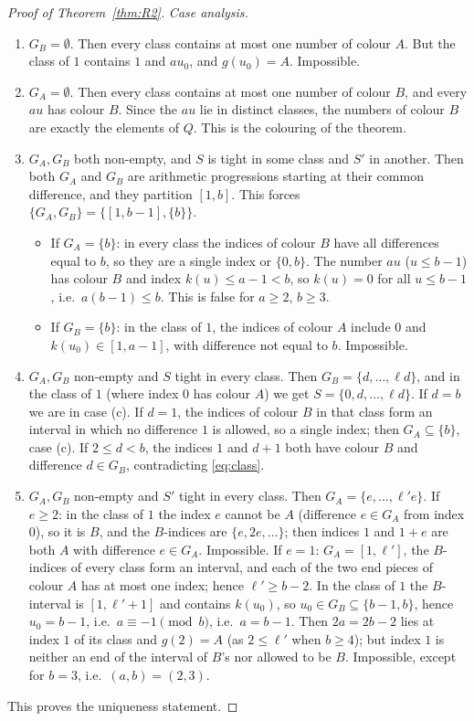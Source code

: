 \documentclass[11pt,a4paper]{article}
\theoremstyle{definition}
\theoremstyle{remark}
\begin{document}
\begin{proof}[Proof of Theorem~\ref{thm:R2}]
\emph{Case analysis.}
\begin{enumerate}[label=(\alph*)]
\item $G_B=\emptyset$. Then every class contains at most one number of colour $A$. But the class of $1$ contains $1$ and $au_0$, and $g(u_0)=A$. Impossible.
\item $G_A=\emptyset$. Then every class contains at most one number of colour $B$, and every $au$ has colour $B$. Since the $au$ lie in distinct classes, the numbers of colour $B$ are exactly the elements of $Q$. This is the colouring of the theorem.
\item $G_A,G_B$ both non-empty, and $S$ is tight in some class and $S'$ in another. Then both $G_A$ and $G_B$ are arithmetic progressions starting at their common difference, and they partition $[1,b]$. This forces $\{G_A,G_B\}=\{[1,b-1],\{b\}\}$.
  \begin{itemize}
  \item If $G_A=\{b\}$: in every class the indices of colour $B$ have all differences equal to $b$, so they are a single index or $\{0,b\}$. The number $au$ ($u\le b-1$) has colour $B$ and index $k(u)\le a-1<b$, so $k(u)=0$ for all $u\le b-1$, i.e.\ $a(b-1)\le b$. This is false for $a\ge2$, $b\ge3$.
  \item If $G_B=\{b\}$: in the class of $1$, the indices of colour $A$ include $0$ and $k(u_0)\in[1,a-1]$, with difference not equal to $b$. Impossible.
  \end{itemize}
\item $G_A,G_B$ non-empty and $S$ tight in every class. Then $G_B=\{d,\dots,\ell d\}$, and in the class of $1$ (where index $0$ has colour $A$) we get $S=\{0,d,\dots,\ell d\}$.
  If $d=b$ we are in case (c). If $d=1$, the indices of colour $B$ in that class form an interval in which no difference $1$ is allowed, so a single index; then $G_A\subseteq\{b\}$, case (c). If $2\le d<b$, the indices $1$ and $d+1$ both have colour $B$ and difference $d\in G_B$, contradicting \eqref{eq:class}.
\item $G_A,G_B$ non-empty and $S'$ tight in every class. Then $G_A=\{e,\dots,\ell'e\}$.
  If $e\ge2$: in the class of $1$ the index $e$ cannot be $A$ (difference $e\in G_A$ from index $0$), so it is $B$, and the $B$-indices are $\{e,2e,\dots\}$; then indices $1$ and $1+e$ are both $A$ with difference $e\in G_A$. Impossible.
  If $e=1$: $G_A=[1,\ell']$, the $B$-indices of every class form an interval, and each of the two end pieces of colour $A$ has at most one index; hence $\ell'\ge b-2$. In the class of $1$ the $B$-interval is $[1,\ell'+1]$ and contains $k(u_0)$, so $u_0\in G_B\subseteq\{b-1,b\}$, hence $u_0=b-1$, i.e.\ $a\equiv-1\pmod b$, i.e.\ $a=b-1$. Then $2a=2b-2$ lies at index $1$ of its class and $g(2)=A$ (as $2\le \ell'$ when $b\ge4$); but index $1$ is neither an end of the interval of $B$'s nor allowed to be $B$. Impossible, except for $b=3$, i.e.\ $(a,b)=(2,3)$.
\end{enumerate}
This proves the uniqueness statement.


\end{proof}
\end{document}
